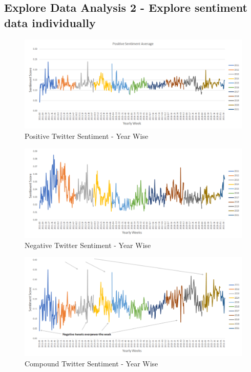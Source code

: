 \documentclass[sigconf, nonacm]{acmart}
\begin{document}
\subsection{Explore Data Analysis 2 - Explore sentiment data individually} %
\begin{figure}[H]
  \centering
  \includegraphics[width=\linewidth]{positive_sent_raw.png}
  \caption{Positive Twitter Sentiment - Year Wise}
\end{figure}

\begin{figure}[H]
  \centering
  \includegraphics[width=\linewidth]{neg_sent_raw.png}
  \caption{Negative Twitter Sentiment - Year Wise}
\end{figure}

\begin{figure}[H]
  \centering
  \includegraphics[width=\linewidth]{comp_sent.png}
  \caption{Compound Twitter Sentiment - Year Wise}
\end{figure}
\end{document}
